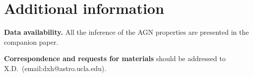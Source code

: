 \documentclass{natureprintstyle}
\newcommand{\lenstronomy}{{\sc Lenstronomy}}
\begin{document}
\section*{Additional information}

\textbf{Data availability.} All the inference of the AGN properties are presented in the companion paper.

\textbf{Correspondence and requests for materials} should be addressed to X.D.~(email:dxh@astro.ucla.edu).



%
%
\end{document}
